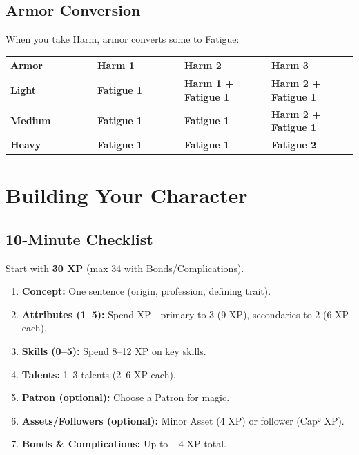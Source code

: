 \documentclass[10pt]{article}
\begin{document}
\subsection{Armor Conversion}
When you take Harm, armor converts some to Fatigue:
\begin{coretable}
\begin{tabular}{>{\bfseries}p{0.25\linewidth} >{\bfseries}p{0.25\linewidth} >{\bfseries}p{0.25\linewidth} >{\bfseries}p{0.25\linewidth}}
\toprule
\textbf{Armor} & \textbf{Harm 1} & \textbf{Harm 2} & \textbf{Harm 3} \\
\midrule
Light & Fatigue 1 & Harm 1 + Fatigue 1 & Harm 2 + Fatigue 1 \\
Medium & Fatigue 1 & Fatigue 1 & Harm 2 + Fatigue 1 \\
Heavy & Fatigue 1 & Fatigue 1 & Fatigue 2 \\
\bottomrule
\end{tabular}
\end{coretable}

\section{Building Your Character}

\subsection{10-Minute Checklist}
Start with \textbf{30 XP} (max 34 with Bonds/Complications).
\begin{enumerate}[leftmargin=*]
    \item \textbf{Concept:} One sentence (origin, profession, defining trait).
    \item \textbf{Attributes (1–5):} Spend XP—primary to 3 (9 XP), secondaries to 2 (6 XP each).
    \item \textbf{Skills (0–5):} Spend 8–12 XP on key skills.
    \item \textbf{Talents:} 1–3 talents (2–6 XP each).
    \item \textbf{Patron (optional):} Choose a Patron for magic.
    \item \textbf{Assets/Followers (optional):} Minor Asset (4 XP) or follower (Cap² XP).
    \item \textbf{Bonds \& Complications:} Up to +4 XP total.
\end{enumerate}
\end{document}

